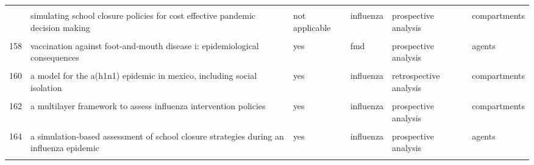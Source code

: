 \documentclass[
]{article}
\begin{document}
\begin{landscape}
\begin{longtable}{l>{\raggedright\arraybackslash}p{3.3cm}l>{\raggedright\arraybackslash}p{3.3cm}>{\raggedright\arraybackslash}p{2cm}l}
\cellcolor{gray!6}{155} & \cellcolor{gray!6}{modeling the impact of air, sea, and land travel restrictions supplemented by other interventions on the emergence of a new influenza pandemic virus} & \cellcolor{gray!6}{yes} & \cellcolor{gray!6}{influenza} & \cellcolor{gray!6}{prospective analysis} & \cellcolor{gray!6}{compartments}\\
\addlinespace
156 & simulating school closure policies for cost effective pandemic decision making & not applicable & influenza & prospective analysis & compartments\\
\cellcolor{gray!6}{157} & \cellcolor{gray!6}{the impact of school closures on pandemic influenza: assessing potential repercussions using a seasonal sir model} & \cellcolor{gray!6}{not applicable} & \cellcolor{gray!6}{influenza} & \cellcolor{gray!6}{prospective analysis} & \cellcolor{gray!6}{compartments}\\
158 & vaccination against foot-and-mouth disease i: epidemiological consequences & yes & fmd & prospective analysis & agents\\
\cellcolor{gray!6}{159} & \cellcolor{gray!6}{a deterministic resource scheduling model in epidemic control: a case study} & \cellcolor{gray!6}{yes} & \cellcolor{gray!6}{influenza} & \cellcolor{gray!6}{prospective analysis} & \cellcolor{gray!6}{compartments}\\
160 & a model for the a(h1n1) epidemic in mexico, including social isolation & yes & influenza & retrospective analysis & compartments\\
\addlinespace
\cellcolor{gray!6}{161} & \cellcolor{gray!6}{a model to evaluate mass vaccination against pneumococcus as a countermeasure against pandemic influenza} & \cellcolor{gray!6}{yes} & \cellcolor{gray!6}{influenza} & \cellcolor{gray!6}{prospective analysis} & \cellcolor{gray!6}{agents}\\
162 & a multilayer framework to assess influenza intervention policies & yes & influenza & prospective analysis & compartments\\
\cellcolor{gray!6}{163} & \cellcolor{gray!6}{a note on the use of optimal control on a discrete time model of influenza dynamics} & \cellcolor{gray!6}{not applicable} & \cellcolor{gray!6}{influenza} & \cellcolor{gray!6}{prospective analysis} & \cellcolor{gray!6}{compartments}\\
164 & a simulation-based assessment of school closure strategies during an influenza epidemic & yes & influenza & prospective analysis & agents\\
\cellcolor{gray!6}{165} & \cellcolor{gray!6}{agent-based modeling of the spread of influenza-like illness in an emergency department: a simulation study} & \cellcolor{gray!6}{yes} & \cellcolor{gray!6}{influenza} & \cellcolor{gray!6}{prospective analysis} & \cellcolor{gray!6}{agents}\\

\end{longtable}
\end{landscape}
\end{document}
